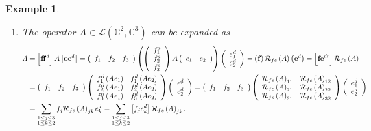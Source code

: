 \documentclass[aps,preprint]{revtex4}%
\newtheorem{example}[theorem]{Example}
\begin{document}
\begin{example}
\begin{enumerate}
\item The operator $A\in\mathcal{L}\left(  \mathbb{C}^{2},\mathbb{C}%
^{3}\right)  $ can be expanded as
\begin{align}
A  &  =\left[  \mathbf{ff}^{d}\right]  A\left[  \mathbf{ee}^{d}\right]
=\left(
\begin{array}
[c]{ccc}%
f_{1} & f_{2} & f_{3}%
\end{array}
\right)  \left(  \left(
\begin{array}
[c]{c}%
f_{1}^{d}\\
f_{2}^{d}\\
f_{3}^{d}%
\end{array}
\right)  A\left(
\begin{array}
[c]{cc}%
e_{1} & e_{2}%
\end{array}
\right)  \right)  \left(
\begin{array}
[c]{c}%
e_{1}^{d}\\
e_{2}^{d}%
\end{array}
\right)  =\left(  \mathbf{f}\right)  \mathcal{R}_{fe}\left(  A\right)  \left(
\mathbf{e}^{d}\right)  =\left[  \mathbf{fe}^{dt}\right]  \mathcal{R}%
_{fe}\left(  A\right) \\
&  =\left(
\begin{array}
[c]{ccc}%
f_{1} & f_{2} & f_{3}%
\end{array}
\right)  \left(
\begin{array}
[c]{cc}%
f_{1}^{d}\left(  Ae_{1}\right)  & f_{1}^{d}\left(  Ae_{2}\right) \\
f_{2}^{d}\left(  Ae_{1}\right)  & f_{2}^{d}\left(  Ae_{2}\right) \\
f_{3}^{d}\left(  Ae_{1}\right)  & f_{3}^{d}\left(  Ae_{2}\right)
\end{array}
\right)  \left(
\begin{array}
[c]{c}%
e_{1}^{d}\\
e_{2}^{d}%
\end{array}
\right)  =\left(
\begin{array}
[c]{ccc}%
f_{1} & f_{2} & f_{3}%
\end{array}
\right)  \left(
\begin{array}
[c]{cc}%
\mathcal{R}_{fe}\left(  A\right)  _{11} & \mathcal{R}_{fe}\left(  A\right)
_{12}\\
\mathcal{R}_{fe}\left(  A\right)  _{21} & \mathcal{R}_{fe}\left(  A\right)
_{22}\\
\mathcal{R}_{fe}\left(  A\right)  _{31} & \mathcal{R}_{fe}\left(  A\right)
_{32}%
\end{array}
\right)  \left(
\begin{array}
[c]{c}%
e_{1}^{d}\\
e_{2}^{d}%
\end{array}
\right) \\
&  =\sum_{\substack{1\leq j\leq3\\1\leq k\leq2}}f_{j}\mathcal{R}_{fe}\left(
A\right)  _{jk}e_{k}^{d}=\sum_{\substack{1\leq j\leq3\\1\leq k\leq2}}\left[
f_{j}e_{k}^{d}\right]  \mathcal{R}_{fe}\left(  A\right)  _{jk}.
\end{align}



\end{enumerate}
\end{example}
\end{document}
